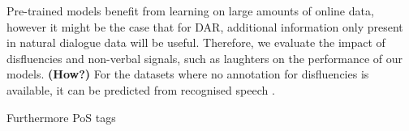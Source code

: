 \documentclass[11pt,a4paper,headings=standardclasses]{article}
\begin{document}
  Pre-trained models benefit from learning on large amounts of online data, however it might be the case that for DAR, additional information only present in natural dialogue data will be useful. Therefore, we evaluate the impact of disfluencies and non-verbal signals, such as laughters on the performance of our models. \textbf{(How?)} For the datasets where no annotation for disfluencies is available, it can be predicted from recognised speech \citep{hough2017joint,shalyminov2018multi}.
  
  Furthermore PoS tags

{}

\end{document}
